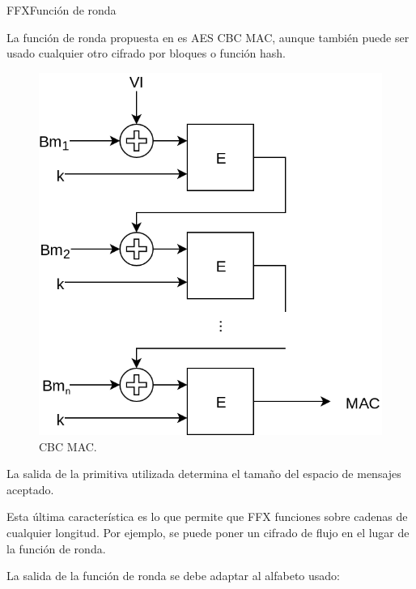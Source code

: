 \begin{frame}{FFX}{Función de ronda}

  {
    La función de ronda propuesta en \cite{ffx_2} es AES CBC MAC, aunque también
    puede ser usado cualquier otro cifrado por bloques o función hash.

    \begin{figure}[H]
      \begin{center}
        \includegraphics[height=0.35\textheight]{diagramas/cbc_mac.png}
        \caption{CBC MAC.}
      \end{center}
    \end{figure}

    La salida de la primitiva utilizada determina el tamaño del espacio de
    mensajes aceptado.
  }

  {
    Esta última característica es lo que permite que FFX funciones sobre
    cadenas de cualquier longitud. Por ejemplo, se puede poner un cifrado
    de flujo en el lugar de la función de ronda.
  }

  {
    La salida de la función de ronda se debe adaptar al alfabeto usado:

    \begin{itemize}


\end{itemize}}
\end{frame}

